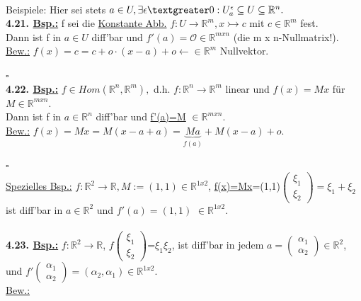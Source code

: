 \documentclass[]{scrartcl}
\begin{document}
\\
Beispiele: Hier sei stets $a\in U, \exists\epsilon 
\textgreater0:U_a^\epsilon\subseteq U\subseteq\mathbb{R}^n.$\\
\textbf{4.21. \underline{Bsp.:}} f sei die \ul{Konstante 
Abb.} $f:U\rightarrow\mathbb{R}^m, x\rightarrowtail c$ mit $c\in\mathbb{R}^m$ 
fest.\\
Dann ist f in $a\in U$ diff'bar und \ul{$f'(a)=\mathcal{O}$}$\in\mathbb{R}^{m x 
n}$ (die m x n-Nullmatrix!).\\
\underline{Bew.:} $f(x)=c=c+o\cdot(x-a)+o \leftarrow \in\mathbb{R}^m$ 
Nullvektor.\\
\strut\hfill$\square$\\
\textbf{4.22. \underline{Bsp.:}} $f\in Hom(\mathbb{R}^n,\mathbb{R}^m),$ d.h. 
$f:\mathbb{R}^n
\rightarrow\mathbb{R}^m$ linear und \ul{$f(x)=Mx$} für $M\in\mathbb{R}^{m x 
n}$.\\
Dann ist f in $a\in\mathbb{R}^n$ diff'bar und \ul{f'(a)=M} $\in\mathbb{R}^{m x 
n}$.\\
\underline{Bew.:} $f(x) = Mx =M(x-a+a)=\underbrace{Ma}_{f(a)}+M(x-a)+o.$\\
\strut\hfill$\square$\\
\underline{Spezielles Bsp.:} $f:\mathbb{R}^2\rightarrow\mathbb{R}, 
M:=(1,1)\in\mathbb{R}^{1x2}$, \ul{f(x)=Mx}=(1,1)$\begin{pmatrix}
	\xi_1\\\xi_2
\end{pmatrix}=\xi_1+\xi_2$\\
ist diff'bar in $a\in\mathbb{R}^2$ und \ul{$f'(a)=(1,1)$} $\in 
\mathbb{R}^{1x2}.$\\
\\
\textbf{4.23. \underline{Bsp.:}} $f:\mathbb{R}^2\rightarrow\mathbb{R}$, 
\ul{$f\begin{pmatrix}
	\xi_1\\\xi_2
\end{pmatrix}$}=$\xi_1\xi_2$, ist diff'bar in jedem $a=\begin{pmatrix}
	\alpha_1\\\alpha_2
\end{pmatrix}\in\mathbb{R}^2$,\\
und \ul{$f'\begin{pmatrix}
	\alpha_1\\\alpha_2
\end{pmatrix}=(\alpha_2,\alpha_1)$}$\in\mathbb{R}^{1x2}$.\\
\underline{Bew.:}\\
\end{document}
